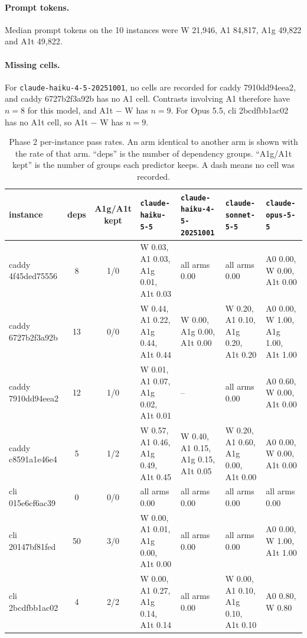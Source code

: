 \documentclass[11pt,a4paper]{article}
\begin{document}
\paragraph{Prompt tokens.}
Median prompt tokens on the 10 instances were W 21,946, A1 84,817, A1g 49,822 and A1t 49,822.

\paragraph{Missing cells.}
For \texttt{claude-haiku-4-5-20251001}, no cells are recorded for caddy 7910dd94eea2, and caddy 6727b2f3a92b has no A1 cell. Contrasts involving A1 therefore have $n=8$ for this model, and A1t $-$ W has $n=9$. For Opus 5.5, cli 2bcdfbb1ac02 has no A1t cell, so A1t $-$ W has $n=9$.

\begin{table}[h]
\centering
\caption{Phase 2 per-instance pass rates. An arm identical to another arm is shown with the rate of that arm. ``deps'' is the number of dependency groups. ``A1g/A1t kept'' is the number of groups each predictor keeps. A dash means no cell was recorded.}
\label{tab:p2inst}
\scriptsize
\begin{tabular}{l c c p{3.2cm} p{3.0cm} p{3.0cm} p{3.0cm}}
\toprule
instance & deps & A1g/A1t kept & \texttt{claude-haiku-5-5} & \texttt{claude-haiku-4-5-20251001} & \texttt{claude-sonnet-5-5} & \texttt{claude-opus-5-5}\\
\midrule
caddy 4f45ded75556 & 8 & 1/0 & W 0.03, A1 0.03, A1g 0.01, A1t 0.03 & all arms 0.00 & all arms 0.00 & A0 0.00, W 0.00, A1t 0.00\\
caddy 6727b2f3a92b & 13 & 0/0 & W 0.44, A1 0.22, A1g 0.44, A1t 0.44 & W 0.00, A1g 0.00, A1t 0.00 & W 0.20, A1 0.10, A1g 0.20, A1t 0.20 & A0 0.00, W 1.00, A1g 1.00, A1t 1.00\\
caddy 7910dd94eea2 & 12 & 1/0 & W 0.01, A1 0.07, A1g 0.02, A1t 0.01 & -- & all arms 0.00 & A0 0.60, W 0.00, A1t 0.00\\
caddy c8591a1e46e4 & 5 & 1/2 & W 0.57, A1 0.46, A1g 0.49, A1t 0.45 & W 0.40, A1 0.15, A1g 0.15, A1t 0.05 & W 0.20, A1 0.60, A1g 0.00, A1t 0.00 & A0 0.00, W 0.00, A1t 0.00\\
cli 015e6cf6ac39 & 0 & 0/0 & all arms 0.00 & all arms 0.00 & all arms 0.00 & all arms 0.00\\
cli 20147bf81fed & 50 & 3/0 & W 0.00, A1 0.01, A1g 0.00, A1t 0.00 & all arms 0.00 & all arms 0.00 & A0 0.00, W 1.00, A1t 1.00\\
cli 2bcdfbb1ac02 & 4 & 2/2 & W 0.00, A1 0.27, A1g 0.14, A1t 0.14 & all arms 0.00 & W 0.00, A1 0.10, A1g 0.10, A1t 0.10 & A0 0.80, W 0.80\\

\end{tabular}
\end{table}
\end{document}
